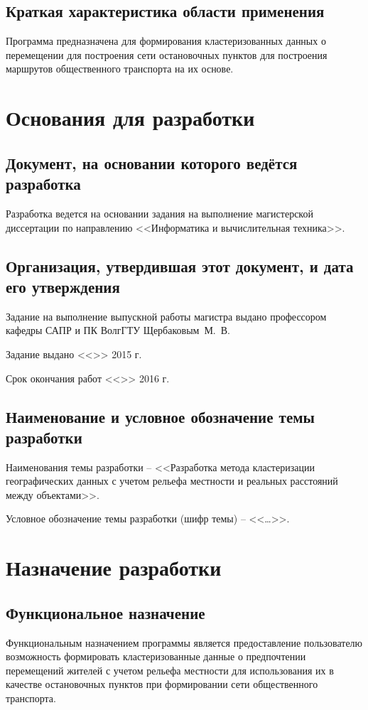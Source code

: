\section{Краткая характеристика области применения}
Программа предназначена для формирования кластеризованных данных о перемещении для построения сети остановочных пунктов для построения маршрутов общественного транспорта на их основе.

\chapter{Основания для разработки}
\section{Документ, на основании которого ведётся разработка}
Разработка ведется на основании задания на выполнение магистерской диссертации по направлению 
<<Информатика и вычислительная техника>>.

\section{Организация, утвердившая этот документ, и дата его утверждения}
Задание на выполнение выпускной работы магистра выдано профессором кафедры САПР и ПК ВолгГТУ Щербаковым~М.~В.

Задание выдано <<\LINE{1cm}>> \LINE{5cm} 2015 г.

Срок окончания работ <<\LINE{1cm}>> \LINE{5cm} 2016 г.

\section{Наименование и условное обозначение темы разработки}
Наименования темы разработки -- <<Разработка метода кластеризации географических данных с учетом рельефа местности и реальных расстояний между объектами>>.

Условное обозначение темы разработки (шифр темы) -- <<\ldots>>.

\chapter{Назначение разработки}
\section{Функциональное назначение}
Функциональным назначением программы является предоставление пользователю возможность формировать кластеризованные данные о предпочтении перемещений жителей с учетом рельефа местности для использования их в качестве остановочных пунктов при формировании сети общественного транспорта.

